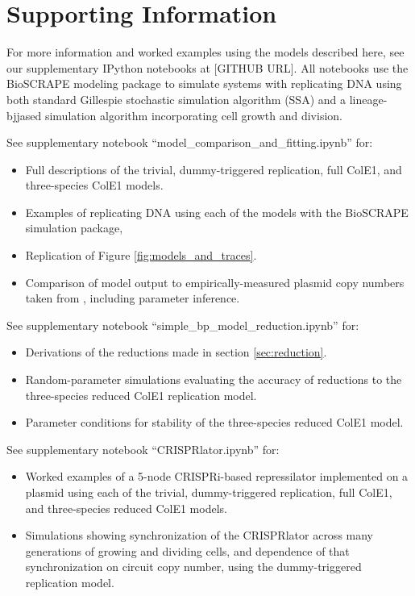 \documentclass[journal = jacsat,manuscript = note]{achemso}
\begin{document}
\section{Supporting Information}

For more information and worked examples using the models described here, see our supplementary IPython notebooks at [GITHUB URL]. All notebooks use the BioSCRAPE modeling package to simulate systems with replicating DNA using both standard Gillespie stochastic simulation algorithm (SSA)\cite{Gillespie1977} and a lineage-bjjased simulation algorithm incorporating cell growth and division.

See supplementary notebook ``model\_comparison\_and\_fitting.ipynb'' for:

\begin{itemize}
	\item Full descriptions of the trivial, dummy-triggered replication, full ColE1, and three-species ColE1 models.
	\item Examples of replicating DNA using each of the models with the BioSCRAPE simulation package, 
	\item Replication of Figure \ref{fig:models_and_traces}.
	\item Comparison of model output to empirically-measured plasmid copy numbers taken from \cite{Shao2021}, including parameter inference. 
\end{itemize}

See supplementary notebook ``simple\_bp\_model\_reduction.ipynb'' for:

\begin{itemize}
	\item Derivations of the reductions made in section \ref{sec:reduction}.
	\item Random-parameter simulations evaluating the accuracy of reductions to the three-species reduced ColE1 replication model.
	\item Parameter conditions for stability of the three-species reduced ColE1 model.
\end{itemize}

See supplementary notebook ``CRISPRlator.ipynb'' for:

\begin{itemize}
	\item Worked examples of a 5-node CRISPRi-based repressilator \cite{Clamons2017, Javier2020} implemented on a plasmid using each of the trivial, dummy-triggered replication, full ColE1, and three-species reduced ColE1 models.
	\item Simulations showing synchronization of the CRISPRlator across many generations of growing and dividing cells, and dependence of that synchronization on circuit copy number, using the dummy-triggered replication model.
\end{itemize}
\end{document}
